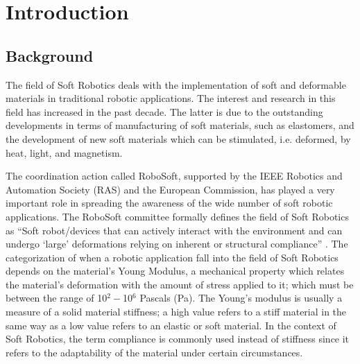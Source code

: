 \chapter{Introduction} \label{ch1:introduction}
\section{ Background}

The field of Soft Robotics deals with the implementation of soft and deformable materials in traditional robotic applications. The interest and research in this field has increased in the past decade. The latter is due to the outstanding developments in terms of manufacturing of soft materials, such as elastomers, and the development of new soft materials which can be stimulated, i.e. deformed, by heat, light, and magnetism. 

The coordination action called RoboSoft, supported by the IEEE Robotics and Automation Society (RAS) and the European Commission, has played a very important role in spreading the awareness of the wide number of soft robotic applications. The RoboSoft committee formally defines the field of Soft Robotics as ``Soft robot/devices that can actively interact with the environment and can undergo `large' deformations relying on inherent or structural compliance'' \cite{laschi2016soft}. The categorization of when a robotic application fall into the field of Soft Robotics depends on the material's Young Modulus, a mechanical property which relates the material's deformation with the amount of stress applied to it; which must be between the range of 10$^{2} - $10$^{6}$ Pascals (Pa). The Young's modulus is usually a measure of a solid material stiffness; a high value refers to a stiff material in the same way as a low value refers to an elastic or soft material. In the context of Soft Robotics, the term compliance is commonly used instead of stiffness since it refers to the adaptability of the material under certain circumstances.

